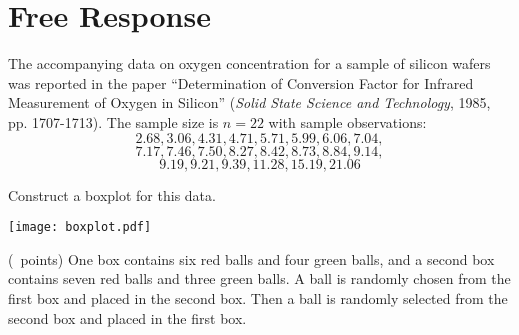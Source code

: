 \section{Free Response}
\begin{questions}
    \question[7] The accompanying data on oxygen concentration for a
                  sample of silicon wafers was reported in the paper
                  ``Determination of Conversion Factor for Infrared
                  Measurement of Oxygen in Silicon'' ({\it Solid State
                  Science and Technology}, 1985, pp. 1707-1713). The
                  sample size is $n = 22$ with sample observations:
                  $$2.68, 3.06, 4.31, 4.71, 5.71, 5.99, 6.06, 7.04,$$
                  $$7.17, 7.46, 7.50, 8.27, 8.42, 8.73, 8.84, 9.14,$$
                  $$9.19, 9.21, 9.39, 11.28, 15.19, 21.06$$

                  Construct a boxplot for this data.
    \begin{solution}         
        \texttt{[image: boxplot.pdf]}
    \end{solution}

    \question (\totalpoints\ points) One box contains six red balls
                 and four green balls, and a second box contains seven
                 red balls and three green balls. A ball is randomly
                 chosen from the first box and placed in the second
                 box. Then a ball is randomly selected from the second
                 box and placed in the first box.


\end{questions}
